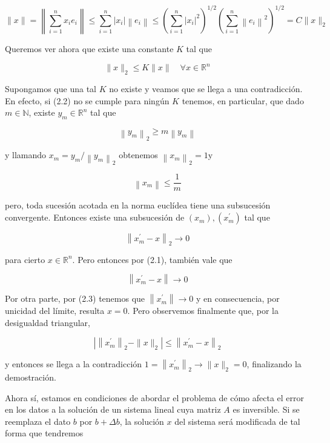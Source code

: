 \documentclass[10pt]{book}
\begin{document}
\begin{equation*}
\|x\|=\left\|\sum_{i=1}^{n} x_{i} e_{i}\right\| \leq \sum_{i=1}^{n}\left|x_{i}\right|\left\|e_{i}\right\| \leq\left(\sum_{i=1}^{n}\left|x_{i}\right|^{2}\right)^{1 / 2}\left(\sum_{i=1}^{n}\left\|e_{i}\right\|^{2}\right)^{1 / 2}=C\|x\|_{2} \tag{2.1}
\end{equation*}


Queremos ver ahora que existe una constante $K$ tal que


\begin{equation*}
\|x\|_{2} \leq K\|x\| \quad \forall x \in \mathbb{R}^{n} \tag{2.2}
\end{equation*}


Supongamos que una tal $K$ no existe y veamos que se llega a una contradicción. En efecto, si (2.2) no se cumple para ningún $K$ tenemos, en particular, que dado $m \in \mathbb{N}$, existe $y_{m} \in \mathbb{R}^{n}$ tal que

$$
\left\|y_{m}\right\|_{2} \geq m\left\|y_{m}\right\|
$$

y llamando $x_{m}=y_{m} /\left\|y_{m}\right\|_{2}$ obtenemos $\left\|x_{m}\right\|_{2}=1 \mathrm{y}$


\begin{equation*}
\left\|x_{m}\right\| \leq \frac{1}{m} \tag{2.3}
\end{equation*}


pero, toda sucesión acotada en la norma euclídea tiene una subsucesión convergente. Entonces existe una subsucesión de $\left(x_{m}\right),\left(x_{m}^{\prime}\right)$ tal que

$$
\left\|x_{m}^{\prime}-x\right\|_{2} \rightarrow 0
$$

para cierto $x \in \mathbb{R}^{n}$. Pero entonces por (2.1), también vale que

$$
\left\|x_{m}^{\prime}-x\right\| \rightarrow 0
$$

Por otra parte, por (2.3) tenemos que $\left\|x_{m}^{\prime}\right\| \rightarrow 0$ y en consecuencia, por unicidad del límite, resulta $x=0$. Pero observemos finalmente que, por la desigualdad triangular,

$$
\left|\left\|x_{m}^{\prime}\right\|_{2}-\|x\|_{2}\right| \leq\left\|x_{m}^{\prime}-x\right\|_{2}
$$

y entonces se llega a la contradicción $1=\left\|x_{m}^{\prime}\right\|_{2} \rightarrow\|x\|_{2}=0$, finalizando la demostración.

Ahora sí, estamos en condiciones de abordar el problema de cómo afecta el error en los datos a la solución de un sistema lineal cuya matriz $A$ es inversible. Si se reemplaza el dato $b$ por $b+\Delta b$, la solución $x$ del sistema será modificada de tal forma que tendremos
\end{document}
